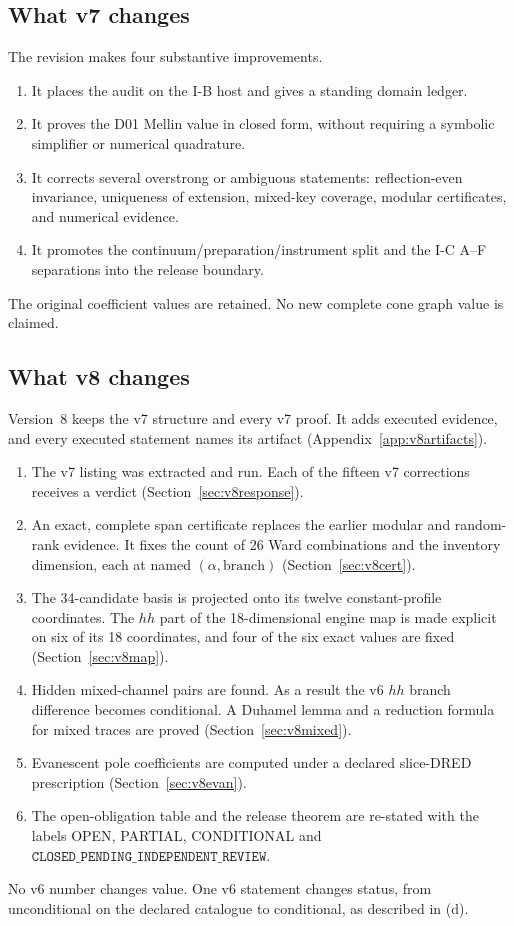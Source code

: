\documentclass[11pt,a4paper]{article}
\newcommand{\OPEN}{\textsf{OPEN}}
\newcommand{\CONDITIONAL}{\textsf{CONDITIONAL}}
\newcommand{\PARTIAL}{\textsf{PARTIAL}}
\theoremstyle{plain}
\theoremstyle{definition}
\theoremstyle{remark}
\numberwithin{equation}{section}
\begin{document}
\subsection{What v7 changes}

The revision makes four substantive improvements.
\begin{enumerate}[label=\textup{(\alph*)}]
\item It places the audit on the I-B host and gives a standing
domain ledger.
\item It proves the D01 Mellin value in closed form, without
requiring a symbolic simplifier or numerical quadrature.
\item It corrects several overstrong or ambiguous statements:
reflection-even invariance, uniqueness of extension, mixed-key
coverage, modular certificates, and numerical evidence.
\item It promotes the continuum/preparation/instrument split and
the I-C A--F separations into the release boundary.
\end{enumerate}

The original coefficient values are retained. No new complete
cone graph value is claimed.

\subsection{What v8 changes}
\label{sec:whatv8}

Version~8 keeps the v7 structure and every v7 proof. It adds
executed evidence, and every executed statement names its
artifact (Appendix~\ref{app:v8artifacts}).
\begin{enumerate}[label=\textup{(\alph*)}]
\item The v7 listing was extracted and run. Each of the fifteen
v7 corrections receives a verdict
(Section~\ref{sec:v8response}).
\item An exact, complete span certificate replaces the earlier
modular and random-rank evidence. It fixes the count of 26 Ward
combinations and the inventory dimension, each at named
\((\alpha,\text{branch})\) (Section~\ref{sec:v8cert}).
\item The 34-candidate basis is projected onto its twelve
constant-profile coordinates. The \(hh\) part of the
18-dimensional engine map is made explicit on six of its 18
coordinates, and four of the six exact values are fixed
(Section~\ref{sec:v8map}).
\item Hidden mixed-channel pairs are found. As a result the v6
\(hh\) branch difference becomes conditional. A Duhamel lemma
and a reduction formula for mixed traces are proved
(Section~\ref{sec:v8mixed}).
\item Evanescent pole coefficients are computed under a declared
slice-DRED prescription (Section~\ref{sec:v8evan}).
\item The open-obligation table and the release theorem are
re-stated with the labels \OPEN, \PARTIAL, \CONDITIONAL{} and
\(\texttt{CLOSED\_PENDING\_INDEPENDENT\_REVIEW}\).
\end{enumerate}
No v6 number changes value. One v6 statement changes status, from
unconditional on the declared catalogue to conditional, as
described in (d).
\end{document}

